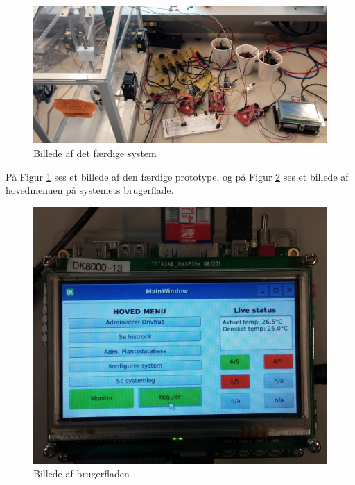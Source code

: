 \begin{figure}[h!]
\centering
\includegraphics[width=\textwidth]{../fig/foto_system_crop}
\caption{Billede af det færdige system}
\label{fig:system_billede}
\end{figure}

På Figur \ref{fig:system_billede} ses et billede af den færdige prototype, og på Figur \ref{fig:gui_billede} ses et billede af hovedmenuen på systemets brugerflade.

\begin{figure}[h!]
\centering
\includegraphics[width=\textwidth-5cm]{../fig/foto_gui_crop}
\caption{Billede af brugerfladen}
\label{fig:gui_billede}
\end{figure}